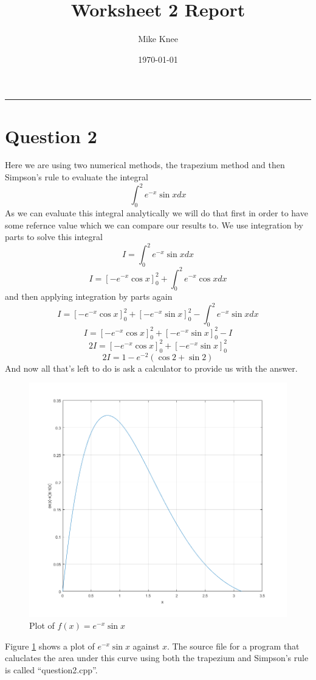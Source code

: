 \documentclass[a4paper,12pt]{UoBnote}
\author{Mike Knee}
\title{Worksheet 2 Report}
\date{\today}
\begin{document}
\maketitle
\tableofcontents
\vspace{1cm}\hrule \vspace{1cm}

\section{Question 2}

Here we are using two numerical methods, the trapezium method and then Simpson's rule to evaluate the integral
\[\int_{0}^{2} e^{-x}\sin{x} dx\]
As we can evaluate this integral analytically we will do that first in order to have some refernce value which we can compare our results to. We use integration by parts to solve this integral
\[I = \int_{0}^{2} e^{-x}\sin{x} dx \]
\[I = \left[ -e^{-x}\cos{x} \right]_{0}^{2} + \int_{0}^{2} e^{-x}\cos{x} dx \]
and then applying integration by parts again
\[I = \left[ -e^{-x}\cos{x} \right]_{0}^{2} + \left[ -e^{-x}\sin{x} \right]_{0}^{2} - \int_{0}^{2} e^{-x}\sin{x} dx \] 
\[I = \left[ -e^{-x}\cos{x} \right]_{0}^{2} + \left[ -e^{-x}\sin{x} \right]_{0}^{2} - I \] 
\[2I = \left[ -e^{-x}\cos{x} \right]_{0}^{2} + \left[ -e^{-x}\sin{x} \right]_{0}^{2} \] 
\[2I = 1 - e^{-2}(\cos{2}+\sin{2}) \]
And now all that's left to do is ask a calculator to provide us with the answer.

\begin{figure}
	\centering
	\includegraphics[scale=0.7]{ExpSin}
	\caption{Plot of $f(x)=e^{-x}\sin{x}$}
	\label{fig:expsin}
\end{figure}

Figure \ref{fig:expsin} shows a plot of $e^{-x}\sin{x}$ against $x$. The source file for a program that caluclates the area under this curve using both the trapezium and Simpson's rule is called ``question2.cpp''.

\printbibliography
\end{document}
